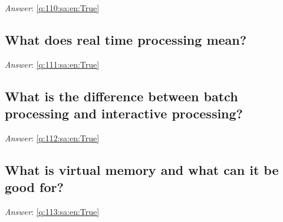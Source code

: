 \documentclass[a4paper,11pt,oneside]{article}
\begin{document}
\begin{sloppypar}
\label{q:110:sa:en:False}

\vspace{2cm}

\noindent\makebox[\textwidth]{\hrulefill}

\vspace{1cm}

\textit{Answer}: \autoref{q:110:sa:en:True}



\subsection{What does real time processing mean?}

\label{q:111:sa:en:False}

\vspace{2cm}

\noindent\makebox[\textwidth]{\hrulefill}

\vspace{1cm}

\textit{Answer}: \autoref{q:111:sa:en:True}



\subsection{What is the difference between batch processing and interactive processing?}

\label{q:112:sa:en:False}

\vspace{2cm}

\noindent\makebox[\textwidth]{\hrulefill}

\vspace{1cm}

\textit{Answer}: \autoref{q:112:sa:en:True}



\subsection{What is virtual memory and what can it be good for?}

\label{q:113:sa:en:False}

\vspace{2cm}

\noindent\makebox[\textwidth]{\hrulefill}

\vspace{1cm}

\textit{Answer}: \autoref{q:113:sa:en:True}




\end{sloppypar}
\end{document}
